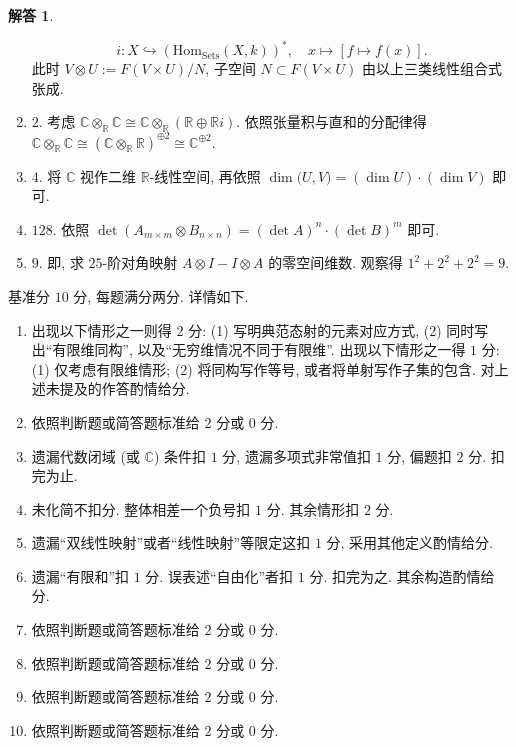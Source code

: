 \documentclass{MainStyle}
\theoremstyle{definition}
\newtheorem{solution}{解答}
\begin{document}
\begin{solution}
\begin{enumerate}
\begin{equation}
                  i: X\hookrightarrow (\mathrm{Hom}_{\mathrm{Sets}}(X,k))^\ast ,\quad x\mapsto [f\mapsto f(x)].
              \end{equation}
              此时 $V\otimes U:=F(V\times U)/N$, 子空间 $N\subset F(V\times U)$ 由以上三类线性组合式张成.
        \item $2$. 考虑 $\mathbb C\otimes _{\mathbb R}\mathbb C\cong \mathbb C\otimes_{\mathbb R}(\mathbb R\oplus \mathbb Ri)$. 依照张量积与直和的分配律得 $\mathbb C\otimes_{\mathbb R}\mathbb C\cong (\mathbb C\otimes_{\mathbb R}\mathbb R)^{\oplus 2}\cong \mathbb C^{\oplus 2}$.
        \item $4$. 将 $\mathbb C$ 视作二维 $\mathbb R$-线性空间, 再依照 $\dim \mathcal (U,V)=(\dim U)\cdot (\dim V)$ 即可.
        \item $128$. 依照 $\det(A_{m\times m}\otimes B_{n\times n})=(\det A)^n\cdot (\det B)^m$ 即可.
        \item $9$. 即, 求 $25$-阶对角映射 $A\otimes I-I\otimes A$ 的零空间维数. 观察得 $1^2+2^2+2^2=9$.
    \end{enumerate}
\end{solution}

\begin{evaluation}
    基准分 $10$ 分, 每题满分两分. 详情如下.
    \begin{enumerate}
        \item 出现以下情形之一则得 $2$ 分: (1) 写明典范态射的元素对应方式, (2) 同时写出``有限维同构'', 以及``无穷维情况不同于有限维''. 出现以下情形之一得 $1$ 分: (1) 仅考虑有限维情形; (2) 将同构写作等号, 或者将单射写作子集的包含. 对上述未提及的作答酌情给分.
        \item 依照判断题或简答题标准给 $2$ 分或 $0$ 分.
        \item 遗漏代数闭域 (或 $\mathbb C$) 条件扣 $1$ 分, 遗漏多项式非常值扣 $1$ 分, 偏题扣 $2$ 分. 扣完为止.
        \item 未化简不扣分. 整体相差一个负号扣 $1$ 分. 其余情形扣 $2$ 分.
        \item 遗漏``双线性映射''或者``线性映射''等限定这扣 $1$ 分, 采用其他定义酌情给分.
        \item 遗漏``有限和''扣 $1$ 分. 误表述``自由化''者扣 $1$ 分. 扣完为之. 其余构造酌情给分.
        \item 依照判断题或简答题标准给 $2$ 分或 $0$ 分.
        \item 依照判断题或简答题标准给 $2$ 分或 $0$ 分.
        \item 依照判断题或简答题标准给 $2$ 分或 $0$ 分.
        \item 依照判断题或简答题标准给 $2$ 分或 $0$ 分.
    \end{enumerate}
\end{evaluation}
\end{document}
